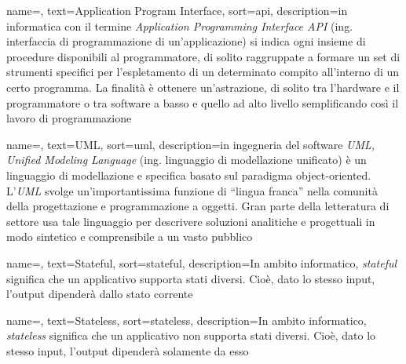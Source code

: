 
\renewcommand{\acronymname}{Acronimi e abbreviazioni}




{
    name=,
    text=Application Program Interface,
    sort=api,
    description={in informatica con il termine \emph{Application Programming Interface API} (ing. interfaccia di programmazione di un'applicazione) si indica ogni insieme di procedure disponibili al programmatore, di solito raggruppate a formare un set di strumenti specifici per l'espletamento di un determinato compito all'interno di un certo programma. La finalità è ottenere un'astrazione, di solito tra l'hardware e il programmatore o tra software a basso e quello ad alto livello semplificando così il lavoro di programmazione}
}

{
    name=,
    text=UML,
    sort=uml,
    description={in ingegneria del software \emph{UML, Unified Modeling Language} (ing. linguaggio di modellazione unificato) è un linguaggio di modellazione e specifica basato sul paradigma object-oriented. L'\emph{UML} svolge un'importantissima funzione di ``lingua franca'' nella comunità della progettazione e programmazione a oggetti. Gran parte della letteratura di settore usa tale linguaggio per descrivere soluzioni analitiche e progettuali in modo sintetico e comprensibile a un vasto pubblico}
}

{
    name=,
    text=Stateful,
    sort=stateful,
    description={In ambito informatico, \emph{stateful} significa che un applicativo supporta stati diversi. Cioè, dato lo stesso input, l'output dipenderà dallo stato corrente}
}

{
    name=,
    text=Stateless,
    sort=stateless,
    description={In ambito informatico, \emph{stateless} significa che un applicativo non supporta stati diversi. Cioè, dato lo stesso input, l'output dipenderà solamente da esso}
}

